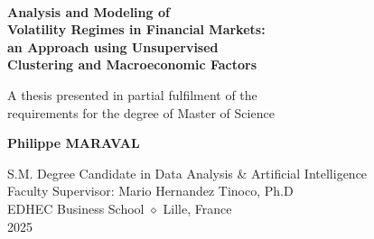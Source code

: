 \begin{titlepage}
    \begin{center}
        \begin{minipage}{0.5\textwidth}
        \end{minipage} \\
        \vspace*{1cm}
        \Huge
        \textbf{Analysis and Modeling of \\ \hspace{-0.9cm}Volatility Regimes in Financial Markets: \\ 
        an Approach using Unsupervised \\
        \hspace{-0.6cm} Clustering and Macroeconomic Factors}

 
        \vspace{1.5cm}
 
        A thesis presented in partial fulfilment of the \\
        \hspace{-0.6cm} requirements for the degree of Master of Science
 
        \vfill
 
        \textbf{Philippe MARAVAL}
 
        \vspace{0.6cm}
 

 
        \Large
        S.M. Degree Candidate in Data Analysis \& Artificial Intelligence\\
        Faculty Supervisor: Mario Hernandez Tinoco, Ph.D\\
        EDHEC Business School $\diamond$ Lille, France\\
        2025
 
    \end{center}
\end{titlepage}